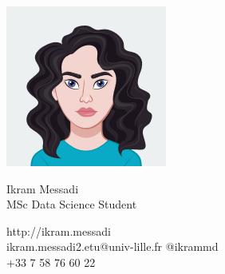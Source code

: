 \documentclass{article}
\begin{document}
\centering \includegraphics[width=.25\linewidth]{ikram-logo}\\[5pt]
\parbox{2in}{\Large \centering Ikram Messadi\\[1pt]
\normalsize MSc Data Science Student}

\vfill
\raggedright
\begin{multicols}{2}
http://ikram.messadi\\
ikram.messadi2.etu@univ-lille.fr
\columnbreak
\raggedleft
@ikrammd\\
+33 7 58 76 60 22%
\end{multicols}%
\end{document}
